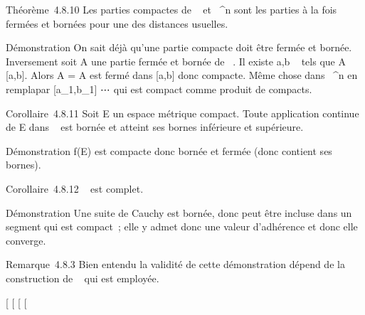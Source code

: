 \documentclass[]{article}
\begin{document}
Théorème~4.8.10 Les parties compactes de ~ et ~^n sont les
parties à la fois fermées et bornées pour une des distances usuelles.

Démonstration On sait déjà qu'une partie compacte doit être fermée et
bornée. Inversement soit A une partie fermée et bornée de ~. Il existe
a,b \in {}~ tels que A \subset~ [a,b]. Alors A = A \bigcap [a,b] est fermé dans
[a,b] donc compacte. Même chose dans ~^n en
rempla\ccant [a,b] par
[a_1,b_1] \times⋯ \times
[a_n,b_n] qui est compact comme produit de
compacts.

Corollaire~4.8.11 Soit E un espace métrique compact. Toute application
continue de E dans ~ est bornée et atteint ses bornes inférieure et
supérieure.

Démonstration f(E) est compacte donc bornée et fermée (donc contient ses
bornes).

Corollaire~4.8.12 ~ est complet.

Démonstration Une suite de Cauchy est bornée, donc peut être incluse
dans un segment qui est compact~; elle y admet donc une valeur
d'adhérence et donc elle converge.

Remarque~4.8.3 Bien entendu la validité de cette démonstration dépend de
la construction de ~ qui est employée.

[
[
[
[
\end{document}
